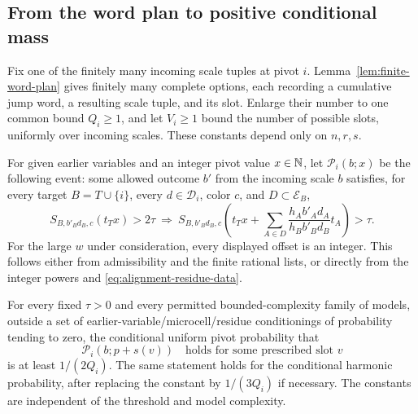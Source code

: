 \subsection{From the word plan to positive conditional mass}

Fix one of the finitely many incoming scale tuples at pivot $i$.
Lemma~\ref{lem:finite-word-plan} gives finitely many complete
options, each recording a cumulative jump word, a resulting scale
tuple, and its slot.  Enlarge their number to one common bound
$Q_i\ge1$, and let $V_i\ge1$ bound the number of possible slots,
uniformly over incoming scales.  These constants depend only on
$n,r,s$.

For given earlier variables and an integer pivot value $x\in\mathbb N$, let
$\mathcal P_i(b;x)$ be the following event: some allowed outcome
$b'$ from the incoming scale $b$ satisfies, for every target
$B=T\cup\{i\}$, every $d\in\mathcal D_i$, color $c$, and
$D\subset\mathcal E_B$,
\begin{equation}\label{eq:alignment-pivot-property}
 S_{B,b'_Bd_B,c}(t_Tx)>2\tau
 \ \Longrightarrow\ %
 S_{B,b'_Bd_B,c}\left(t_Tx+
       \sum_{A\in D}\frac{h_A b'_A d_A}{h_B b'_B d_B}t_A\right)>\tau.
\end{equation}
For the large $w$ under consideration, every displayed offset is
an integer.  This follows either from admissibility and the finite
rational lists, or directly from the integer powers and
\eqref{eq:alignment-residue-data}.

\begin{lemma}\label{lem:alignment-mass}
For every fixed $\tau>0$ and every permitted bounded-complexity
family of models, outside a set of earlier-variable/microcell/residue
conditionings of probability tending to zero, the conditional
uniform pivot probability that
\[
 \mathcal P_i(b;p+s(v))\quad\text{holds for some prescribed slot }v
\]
is at least $1/(2Q_i)$.  The same statement holds for the conditional
harmonic probability, after replacing the constant by $1/(3Q_i)$
if necessary.  The constants are independent of the threshold and
model complexity.
\end{lemma}

